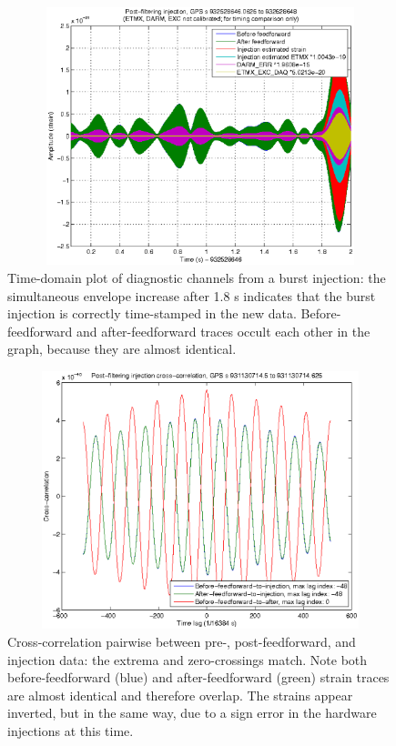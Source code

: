 \begin{figure}
\begin{center}
\includegraphics[height=75mm, width=150mm]{figure7.eps}
\caption{Time-domain plot of diagnostic channels from a burst injection: the simultaneous envelope increase after 1.8 s indicates that the burst injection is correctly time-stamped in the new data. Before-feedforward and after-feedforward traces occult each other in the graph, because they are almost identical.}
\label{timeDomainInjection}
\end{center}
\end{figure}

\begin{figure}
\begin{center}
\includegraphics[height=75mm, width=150mm]{figure8.eps}
\caption{Cross-correlation pairwise between pre-, post-feedforward, and injection data: the extrema and zero-crossings match.  Note both before-feedforward (blue) and after-feedforward (green) strain traces are almost identical and therefore overlap. The strains appear inverted, but in the same way, due to a sign error in the hardware injections at this time.}
\label{crossCorrelationGraph}
\end{center}
\end{figure}

